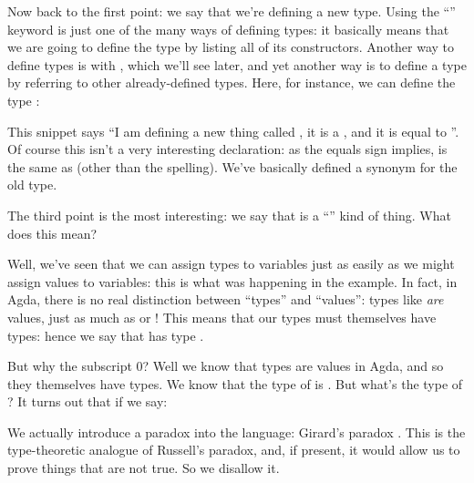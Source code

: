 
Now back to the first point: we say that we're defining a new 
type.
Using the ``'' keyword is just one of the many ways of
defining types: it basically means that we are going to define the type by
listing all of its constructors.
Another way to define types is with , which we'll see later,
and yet another way is to define a type by referring to other already-defined types.
Here, for instance, we can define the type :
\begin{agdalisting*}
\end{agdalisting*}
This snippet says ``I am defining a new thing called , it
is a , and it is equal to ''.
Of course this isn't a very interesting declaration: as the equals sign implies,
 is the same as  (other than the
spelling).
We've basically defined a synonym for the old type.

The third point is the most interesting: we say that  is a
``'' kind of thing.
What does this mean?

Well, we've seen that we can assign types to variables just as easily as we
might assign values to variables: this is what was happening in the
 example.
In fact, in Agda, there is no real distinction between ``types'' and ``values'':
types like  \emph{are} values, just as much as
 or !
This means that our types must themselves have types: hence we say that
 has type .

But why the subscript 0?
Well we know that types are values in Agda, and so they themselves have types.
We know that the type of  is
.
But what's the type of ?
It turns out that if we say:
We actually introduce a paradox into the language: Girard's paradox
\cite{girardInterpretationFonctionelleElimination1972}.
This is the type-theoretic analogue of Russell's paradox, and, if present, it
would allow us to prove things that are not true.
So we disallow it.

